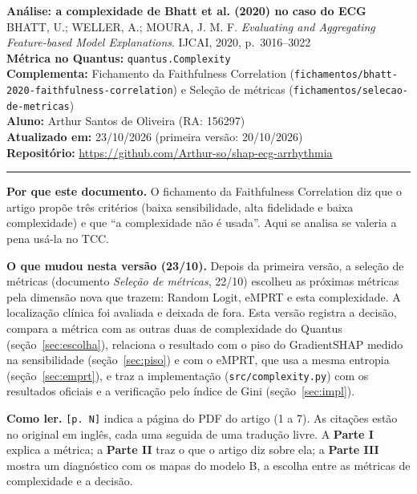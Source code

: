 \documentclass[11pt,a4paper]{article}
\begin{document}
\begin{center}
    {\LARGE \textbf{Análise: a complexidade de Bhatt et al. (2020) no caso do ECG}} \\[0.35em]
    {\large BHATT, U.; WELLER, A.; MOURA, J. M. F. \textit{Evaluating and Aggregating Feature-based Model Explanations}. IJCAI, 2020, p.~3016--3022} \\[0.3em]
    \textbf{Métrica no Quantus:} \texttt{quantus.Complexity} \\[0.2em]
    \textbf{Complementa:} Fichamento da Faithfulness Correlation (\texttt{fichamentos/bhatt-2020-faithfulness-correlation}) e Seleção de métricas (\texttt{fichamentos/selecao-de-metricas}) \\[0.2em]
    \textbf{Aluno:} Arthur Santos de Oliveira (RA: 156297) \\[0.2em]
    \textbf{Atualizado em:} 23/10/2026 (primeira versão: 20/10/2026) \\[0.2em]
    \textbf{Repositório:} \url{https://github.com/Arthur-so/shap-ecg-arrhythmia}
\end{center}
\vspace{-0.5em}
\hrule
\vspace{0.8em}

\textbf{Por que este documento.} O fichamento da Faithfulness Correlation diz que o artigo propõe três critérios (baixa sensibilidade, alta fidelidade e baixa complexidade) e que “a complexidade não é usada”. Aqui se analisa se valeria a pena usá-la no TCC.

\textbf{O que mudou nesta versão (23/10).} Depois da primeira versão, a seleção de métricas (documento \textit{Seleção de métricas}, 22/10) escolheu as próximas métricas pela dimensão nova que trazem: Random Logit, eMPRT e esta complexidade. A localização clínica foi avaliada e deixada de fora. Esta versão registra a decisão, compara a métrica com as outras duas de complexidade do Quantus (seção~\ref{sec:escolha}), relaciona o resultado com o piso do GradientSHAP medido na sensibilidade (seção~\ref{sec:piso}) e com o eMPRT, que usa a mesma entropia (seção~\ref{sec:emprt}), e traz a implementação (\texttt{src/complexity.py}) com os resultados oficiais e a verificação pelo índice de Gini (seção~\ref{sec:impl}).

\textbf{Como ler.} \texttt{[p. N]} indica a página do PDF do artigo (1 a 7). As citações estão no original em inglês, cada uma seguida de uma tradução livre. A \textbf{Parte I} explica a métrica; a \textbf{Parte II} traz o que o artigo diz sobre ela; a \textbf{Parte III} mostra um diagnóstico com os mapas do modelo B, a escolha entre as métricas de complexidade e a decisão.
\end{document}
